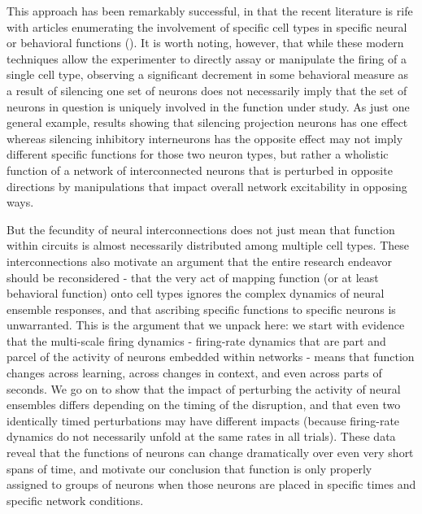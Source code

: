 \begin{refsection}
This approach has been remarkably successful, in that the recent literature is rife with articles enumerating the involvement of specific cell types in specific neural or behavioral functions (\cite{adamantidis2015a,balthazart2020a,biselli2019a,janak2015a,tye2012a}). It is worth noting, however, that while these modern techniques allow the experimenter to directly assay or manipulate the firing of a single cell type, observing a significant decrement in some behavioral measure as a result of silencing one set of neurons does not necessarily imply that the set of neurons in question is uniquely involved in the function under study. As just one general example, results showing that silencing projection neurons has one effect whereas silencing inhibitory interneurons has the opposite effect may not imply different specific functions for those two neuron types, but rather a wholistic function of a network of interconnected neurons that is perturbed in opposite directions by manipulations that impact overall network excitability in opposing ways.

But the fecundity of neural interconnections does not just mean that function within circuits is almost necessarily distributed among multiple cell types. These interconnections also motivate an argument that the entire research endeavor should be reconsidered - that the very act of mapping function (or at least behavioral function) onto cell types ignores the complex dynamics of neural ensemble responses, and that ascribing specific functions to specific neurons is unwarranted. This is the argument that we unpack here: we start with evidence that the multi-scale firing dynamics - firing-rate dynamics that are part and parcel of the activity of neurons embedded within networks - means that function changes across learning, across changes in context, and even across parts of seconds. We go on to show that the impact of perturbing the activity of neural ensembles differs depending on the timing of the disruption, and that even two identically timed perturbations may have different impacts (because firing-rate dynamics do not necessarily unfold at the same rates in all trials). These data reveal that the functions of neurons can change dramatically over even very short spans of time, and motivate our conclusion that function is only properly assigned to groups of neurons when those neurons are placed in specific times and specific network conditions.


\end{refsection}
